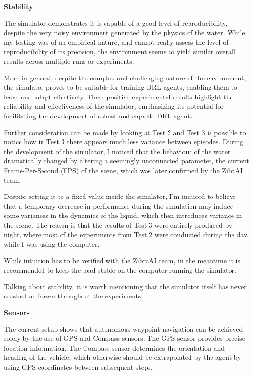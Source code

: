 \begin{textblock}
{\bf Stability }

The simulator demonstrates it is capable of a good level of reproducibility, despite the very noisy environment generated by the physics of the water. While my testing was of an empirical nature, and cannot really assess the level of reproducibility of its precision, the environment seems to yield similar overall results across multiple runs or experiments. 

More in general, despite the complex and challenging nature of the environment, the simulator proves to be suitable for training DRL agents, enabling them to learn and adapt effectively. These positive experimental results highlight the reliability and effectiveness of the simulator, emphasizing its potential for facilitating the development of robust and capable DRL agents.

Further consideration can be made by looking at Test 2 and Test 3 is possible to notice how in Test 3 there appears much less variance between episodes. During the development of the simulator, I noticed that the behaviour of the water dramatically changed by altering a seemingly unconnected parameter, the current Frame-Per-Second (FPS) of the scene, which was later confirmed by the ZibaAI team. 

Despite setting it to a fixed value inside the simulator, I’m induced to believe that a temporary decrease in performance during the simulation may induce some variances in the dynamics of the liquid, which then introduces variance in the scene. The reason is that the results of Test 3 were entirely produced by night, where most of the experiments from Test 2 were conducted during the day, while I was using the computer.

While intuition has to be verified with the ZibraAI team, in the meantime it is recommended to keep the load stable on the computer running the simulator. 

Talking about stability, it is worth mentioning that the simulator itself has never crashed or frozen throughout the experiments.
\end{textblock}




\begin{textblock}
{\bf Sensors }

The current setup shows that autonomous waypoint navigation can be achieved solely by the use of GPS and Compass sensors. The GPS sensor provides precise location information. The Compass sensor determines the orientation and heading of the vehicle, which otherwise should be extrapolated by the agent by using GPS coordinates between subsequent steps.
\end{textblock}




